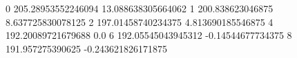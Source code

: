 0 205.28953552246094 13.088638305664062
1 200.838623046875 8.637725830078125
2 197.01458740234375 4.813690185546875
4 192.20089721679688 0.0
6 192.05545043945312 -0.14544677734375
8 191.957275390625 -0.243621826171875
